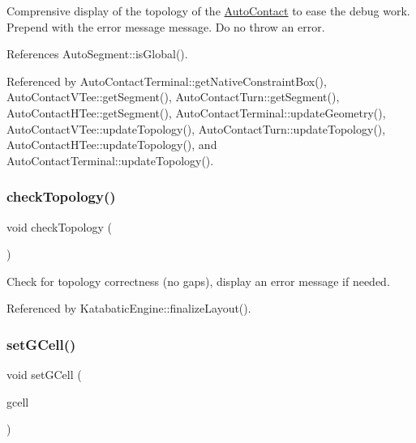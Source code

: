 Comprensive display of the topology of the \hyperlink{classKatabatic_1_1AutoContact}{Auto\+Contact} to ease the debug work. Prepend with the error message {\ttfamily message}. Do no throw an error. 

References Auto\+Segment\+::is\+Global().



Referenced by Auto\+Contact\+Terminal\+::get\+Native\+Constraint\+Box(), Auto\+Contact\+V\+Tee\+::get\+Segment(), Auto\+Contact\+Turn\+::get\+Segment(), Auto\+Contact\+H\+Tee\+::get\+Segment(), Auto\+Contact\+Terminal\+::update\+Geometry(), Auto\+Contact\+V\+Tee\+::update\+Topology(), Auto\+Contact\+Turn\+::update\+Topology(), Auto\+Contact\+H\+Tee\+::update\+Topology(), and Auto\+Contact\+Terminal\+::update\+Topology().

\mbox{\label{classKatabatic_1_1AutoContact_ac371cd5b837a8965c11297c197e70a45}} 
\subsubsection{\texorpdfstring{check\+Topology()}{checkTopology()}}
{\footnotesize\ttfamily void check\+Topology (\begin{DoxyParamCaption}{ }\end{DoxyParamCaption})\hspace{0.3cm}{\ttfamily [virtual]}}

Check for topology correctness (no gaps), display an error message if needed. 

Referenced by Katabatic\+Engine\+::finalize\+Layout().

\mbox{\label{classKatabatic_1_1AutoContact_aa1a02e206437f1371a74cafc724b00d7}} 
\subsubsection{\texorpdfstring{set\+G\+Cell()}{setGCell()}}
{\footnotesize\ttfamily void set\+G\+Cell (\begin{DoxyParamCaption}\item[{\hyperlink{classKatabatic_1_1GCell}{G\+Cell} $\ast$}]{gcell }\end{DoxyParamCaption})}

